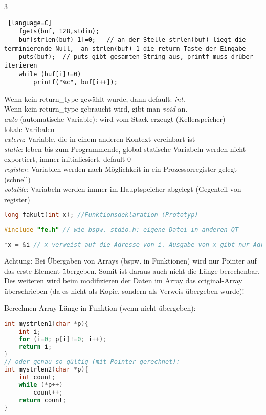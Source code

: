 \begin{multicols*}{3}
\begin{lstlisting} [language=C]
	fgets(buf, 128,stdin);
	buf[strlen(buf)-1]=0;	// an der Stelle strlen(buf) liegt die terminierende Null,  an strlen(buf)-1 die return-Taste der Eingabe
	puts(buf);	// puts gibt gesamten String aus, printf muss drüber iterieren
	while (buf[i]!=0)
		printf("%c", buf[i++]);
\end{lstlisting}
\HRule[4pt]
Wenn kein return\_type gewählt wurde, dann default: \emph{int}.\\
Wenn kein return\_type gebraucht wird, gibt man \emph{void} an.
\\
\emph{auto} (automatische Variable): wird vom Stack erzeugt (Kellerspeicher)\\
lokale Varibalen\\
\emph{extern}: Variable, die in einem anderen Kontext vereinbart ist\\
\emph{static}: leben bis zum Programmende, global-statische Variabeln werden nicht exportiert, immer initialiesiert, default 0\\
\emph{register}: Variablen werden nach Möglichkeit in ein Prozessorregister gelegt (schnell)\\
\emph{volatile}: Variabeln werden immer im Hauptspeicher abgelegt (Gegenteil von register)
\begin{lstlisting}[language=C]
long fakult(int x);	//Funktionsdeklaration (Prototyp)
\end{lstlisting}
\begin{lstlisting}[language=C]
#include "fe.h" // wie bspw. stdio.h: eigene Datei in anderen QT
\end{lstlisting}
\HRule[4pt]
\begin{lstlisting}[language=C]
	*x = &i // x verweist auf die Adresse von i. Ausgabe von x gibt nur Adresse. *x (oder x[0]) (Dereferenzierung) ergibt Wert von i
\end{lstlisting}
Achtung: Bei Übergaben von Arrays (bspw. in Funktionen) wird nur Pointer auf das erste Element übergeben. Somit ist daraus auch nicht die Länge berechenbar. Des weiteren wird beim modifizieren der Daten im Array das original-Array überschrieben (da es nicht als Kopie, sondern als Verweis übergeben wurde)!

Berechnen Array Länge in Funktion (wenn nicht übergeben):
\begin{lstlisting}[language=C]
int mystrlen1(char *p){
	int i;
	for (i=0; p[i]!=0; i++);
	return i;
}
// oder genau so gültig (mit Pointer gerechnet):
int mystrlen2(char *p){
	int count;
	while (*p++)
		count++;
	return count;
}
\end{lstlisting}


\end{multicols*}
